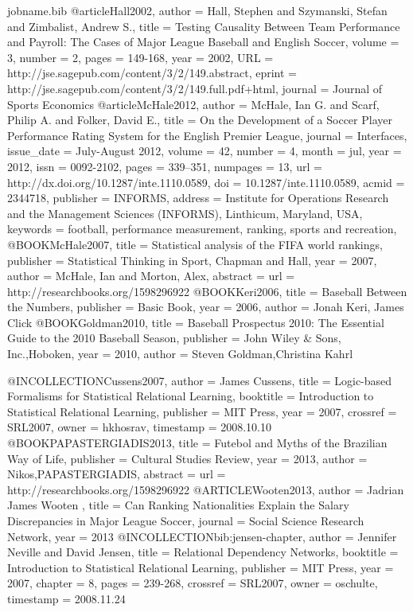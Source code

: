 {\begin{filecontents*}{jobname.bib}
	@article{Hall2002,
		author = {Hall, Stephen and Szymanski, Stefan and Zimbalist, Andrew S.}, 
		title = {Testing Causality Between Team Performance and Payroll: The Cases of Major League Baseball and English Soccer},
		volume = {3}, 
		number = {2}, 
		pages = {149-168}, 
		year = {2002}, 
		URL = {http://jse.sagepub.com/content/3/2/149.abstract}, 
		eprint = {http://jse.sagepub.com/content/3/2/149.full.pdf+html}, 
		journal = {Journal of Sports Economics} 
	}
	@article{McHale2012,
		author = {McHale, Ian G. and Scarf, Philip A. and Folker, David E.},
		title = {On the Development of a Soccer Player Performance Rating System for the English Premier League},
		journal = {Interfaces},
		issue_date = {July-August 2012},
		volume = {42},
		number = {4},
		month = jul,
		year = {2012},
		issn = {0092-2102},
		pages = {339--351},
		numpages = {13},
		url = {http://dx.doi.org/10.1287/inte.1110.0589},
		doi = {10.1287/inte.1110.0589},
		acmid = {2344718},
		publisher = {INFORMS},
		address = {Institute for Operations Research and the Management Sciences (INFORMS), Linthicum, Maryland, USA},
		keywords = {football, performance measurement, ranking, sports and recreation},
	} 
	@BOOK{McHale2007,
		title = {  Statistical  analysis  of  the  FIFA	world rankings},
		publisher = {Statistical Thinking in Sport, Chapman and Hall},
		year = {2007},
		author = {McHale, Ian and Morton, Alex},
		abstract = {url = {http://researchbooks.org/1598296922}}
	}
	@BOOK{Keri2006,
		title = {Baseball Between the Numbers},
		publisher = {Basic Book},
		year = {2006},
		author = {Jonah Keri, James Click}
	}
	@BOOK{Goldman2010,
		title = {Baseball Prospectus 2010: The Essential Guide to the 2010 Baseball Season},
		publisher = {John  Wiley  \&  Sons,  Inc.,Hoboken},
		year = {2010},
		author = {Steven Goldman,Christina Kahrl }
	}
	
	@INCOLLECTION{Cussens2007,
		author = {James Cussens},
		title = {Logic-based Formalisms for Statistical Relational Learning},
		booktitle = {Introduction to Statistical Relational Learning},
		publisher = {MIT Press},
		year = {2007},
		crossref = {SRL2007},
		owner = {hkhosrav},
		timestamp = {2008.10.10}
	}
	@BOOK{PAPASTERGIADIS2013,
		title = {Futebol and Myths of the Brazilian Way of Life},
		publisher = { Cultural Studies Review},
		year = {2013},
		author = {Nikos,PAPASTERGIADIS},
		abstract = {url = {http://researchbooks.org/1598296922}}
	}
	@ARTICLE{Wooten2013,
		author = {Jadrian James Wooten },
		title = {Can Ranking Nationalities Explain the Salary Discrepancies in Major League Soccer},
		journal = {Social Science Research Network},
		year = {2013}
	}
	@INCOLLECTION{bib:jensen-chapter,
		author = {Jennifer Neville and David Jensen},
		title = {Relational Dependency Networks},
		booktitle = {Introduction to Statistical Relational Learning},
		publisher = {MIT Press},
		year = {2007},
		chapter = {8},
		pages = {239-268},
		crossref = {SRL2007},
		owner = {oschulte},
		timestamp = {2008.11.24}
	}
	

\end{filecontents*}}
